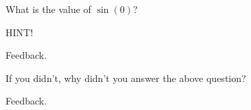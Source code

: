 \documentclass{ximera}
\begin{document}
\begin{problem} 

\begin{problem}
    What is the value of $\sin(0)$?
    
    \begin{hint}
    HINT!
    \end{hint}

  \begin{multipleChoice}
      \choice{$\pi$}
      \choice{$2\pi$}
      
      \begin{feedback}[attempt]
          Feedback.
      \end{feedback}
      
  \end{multipleChoice}
  
\end{problem}

\begin{question}
  
  If you didn't, why didn't you answer the above question?
  
  \begin{multipleChoice}
      
      \begin{feedback}[attempt]
      Feedback.
      \end{feedback}
  \end{multipleChoice}
  
\end{question}

\end{problem}
\end{document}
